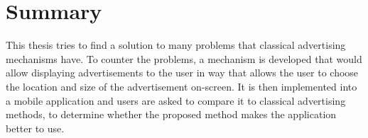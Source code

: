 \section{Summary}
This thesis tries to find a solution to many problems that classical advertising mechanisms have. To counter the problems, a mechanism is developed that would allow displaying advertisements to the user in way that allows the user to choose the location and size of the advertisement on-screen. It is then implemented into a mobile application and users are asked to compare it to classical advertising methods, to determine whether the proposed method makes the application better to use.

